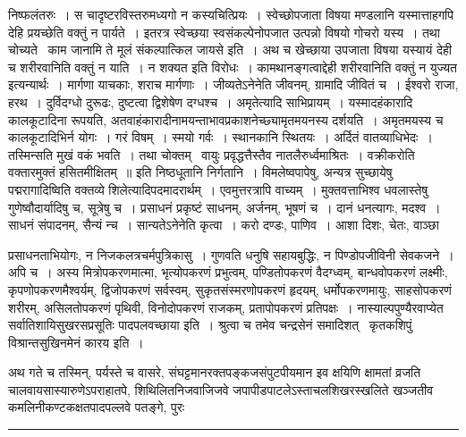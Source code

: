 \documentclass[11pt, openany]{book}
\begin{document}
\noindent
{\s निष्फलंतरुः~। स चादृष्टरविस्तरुमध्यगो न कस्यचित्प्रियः~। स्वेच्छोपजाता विषया मण्डलानि यस्मात्ताहगपि देहि प्रयच्छेति वक्तुं न पार्यते~। इतरत्र स्वेच्छया स्वसंकल्पेनोपजात उत्पन्नो विषयो गोचरो यस्य~। तथा चोच्यते \textendash\ {\qt काम जानामि ते मूलं संकल्पात्किल जायसे} इति~। अथ च खेच्छाया उपजाता विषया यस्यायं देही च शरीरवानिति वक्तुं न याति~। न शक्यत इति विरोधः~। कामथानङ्गत्वाद्देही शरीरवानिति वक्तुं न युज्यत इत्यन्यार्थः~। मार्गणा याचकाः, शराच मार्गणाः~। जीव्यतेऽनेनेति जीवनम्, ग्रामादि जीवितं च~। ईश्वरो राजा, हरथ~। दुर्विदग्धो दुरूढः, दुष्टत्वा द्विशेषेण दग्धश्च~। अमृतेत्यादि साभिप्रायम्~। यस्मादहंकारादि कालकूटादिना रूपयति, अतवाहंकारादीनामयन्ताभावप्रकाशनेच्छ्यामृतमयनस्य दर्शयति~। अमृतमयस्य च कालकूटादिभिर्न योगः~। गरं विषम्~। स्मयो गर्वः~। स्थानकानि स्थितयः~। अर्दितं वातव्याधिभेदः~। तस्मिन्सति मुखं वकं भवति~। तथा चोक्तम् \textendash\ {\qt वायुः प्रवृद्धत्तैस्तैव नातलैरुर्ध्वमाश्रितः~। वक्रीकरोति वक्तारमुक्तं हसितमीक्षितम्~॥} इति निष्ठधूतानि निर्गतानि~। विमलेष्वपापेषु, अन्यत्र सुच्छायेषु पद्मरागादिष्विति वक्तव्ये शिलेत्यादिपदमादरार्थम्~। एवमुत्तरत्रापि वाच्यम्~। मुक्तवत्ताभिश्व धवलास्तेषु गुणेष्वौदार्यादिषु च, सूत्रेषु च~। प्रसाधनं प्रकृष्टं साधनम्, अर्जनम्, भूषणं च~। दानं धनत्यागः, मदश्व~। साधनं संपादनम्, सैन्यं न्च~। सान्यतेऽनेनेति कृत्वा~। करो दण्डः, पाणिव~। आशा दिशः, चेतः, वाञ्छा}

\newpage

\noindent
प्रसाधनताभियोगः, न निजकलत्रचर्मपुत्रिकासु~। गुणवति धनुषि सहायबुद्धिः, न पिण्डोपजीविनी सेवकजने~। अपि च~। अस्य मित्रोपकरणमात्मा, भृत्योपकरणं प्रभुत्वम्, पण्डितोपकरणं वैदग्ध्वम्, बान्धवोपकरणं लक्ष्मीः, कृपणोपकरणमैश्वर्यम्, द्विजोपकरणं सर्वस्वम्, सुकृतसंस्मरणोपकरणं हृदयम्, धर्मोपकरणमायुः, साहसोपकरणं शरीरम्, असिलतोपकरणं पृथिवी, विनोदोपकरणं राजकम्, प्रतापोपकरणं प्रतिपक्षः~। नास्याल्पपुण्यैरवाप्येत सर्वातिशायिसुखरसप्रसूतिः पादपलवच्छाया इति~। श्रुत्वा च तमेव चन्द्रसेनं समादिशत् \textendash\ {\haq कृतकशिपुं विश्रान्तसुखिनमेनं कारय} इति~।

अथ गते च तस्मिन्, पर्यस्ते च वासरे, संघट्टमानरक्तपङ्कजसंपुटपीयमान इव क्षयिणि क्षामतां व्रजति चालवायसास्यारुणेऽपराहातपे, शिथिलितनिजवाजिजवे जपापीडपाटलेऽस्ताचलशिखरस्खलिते खञ्जतीव कमलिनीकण्टकक्षतपादपल्लवे पतङ्गे, पुरः

\vspace{2mm}
\hrule
\end{document}

